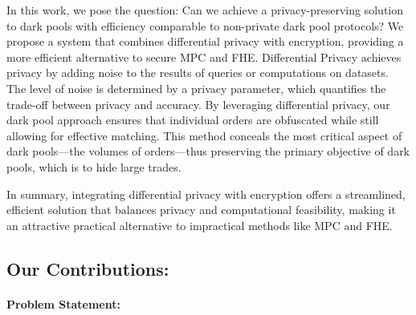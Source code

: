 In this work, we pose the question: Can we achieve a privacy-preserving solution to dark pools with efficiency comparable to non-private dark pool protocols? We propose a system that combines differential privacy with encryption, providing a more efficient alternative to secure MPC and FHE. Differential Privacy achieves privacy by adding noise to the results of queries or computations on datasets. The level of noise is determined by a privacy parameter, which quantifies the trade-off between privacy and accuracy. By leveraging differential privacy, our dark pool approach ensures that individual orders are obfuscated while still allowing for effective matching. This method conceals the most critical aspect of dark pools—the volumes of orders—thus preserving the primary objective of dark pools, which is to hide large trades. 

In summary, integrating differential privacy with encryption offers a streamlined, efficient solution that balances privacy and computational feasibility, making it an attractive practical alternative to impractical methods like MPC and FHE. 

\subsection{Our Contributions:}

\paragraph{Problem Statement:}

